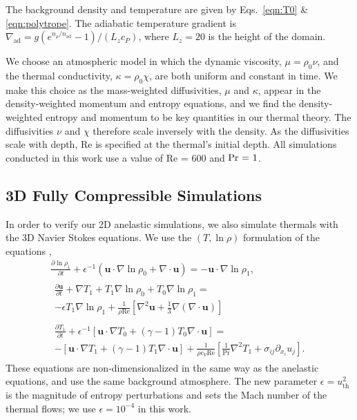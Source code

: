 \documentclass[twocolumn, amsmath, amsfonts, amssymb, trackchanges]{aastex62}
\newcommand{\DivU}{\ensuremath{\nabla\cdot\bm{u}}}
\newcommand{\grad}{\ensuremath{\nabla}}
\begin{document}
The background density and temperature are given by Eqs.~\ref{eqn:T0} \& \ref{eqn:polytrope}.
The adiabatic temperature gradient is $\nabla_{\text{ad}}=g(e^{n_\rho/n_{\text{ad}}}-1)/(L_z c_P)$, where $L_z=20$ is the height of the domain.

We choose an atmospheric model in which the dynamic viscosity, $\mu = \rho_0 \nu$, and the thermal conductivity, $\kappa = \rho_0 \chi$, are both uniform and constant in time.
We make this choice as the mass-weighted diffusivities, $\mu$ and $\kappa$, appear in the density-weighted momentum and entropy equations, and we find the density-weighted entropy and momentum to be key quantities in our thermal theory.
The diffusivities $\nu$ and $\chi$ therefore scale inversely with the density.
As the diffusivities scale with depth, Re is specified at the thermal's initial depth.
All simulations conducted in this work use a value of Re = 600 and $\mbox{\text{Pr} = 1}$.

\subsection{3D Fully Compressible Simulations}
In order to verify our 2D anelastic simulations, we also simulate thermals with the 3D Navier Stokes equations. 
We use the $(T, \ln\rho)$ formulation of the equations \citep{lecoanet&all2014, anders&brown2017},
\begin{gather}
\frac{\partial \ln\rho_1}{\partial t} + \epsilon^{-1}\left(\bm{u}\cdot\grad\ln\rho_0 + \DivU\right) = -\bm{u}\cdot\grad\ln\rho_1, \\
\begin{split}
\frac{\partial \bm{u}}{\partial t}  +\grad T_1 + T_1\grad\ln\rho_0 + T_0\grad\ln\rho_1  =\\
- \epsilon T_1\grad\ln\rho_1 + \frac{1}{\rho\text{Re}}\left[\grad^2\bm{u} + \frac{1}{3}\grad(\DivU)\right]
\end{split} \\
\begin{split}
\frac{\partial T_1}{\partial t} + \epsilon^{-1}\left[\bm{u}\cdot\grad T_0 + (\gamma-1)T_0\DivU\right] = \\
-\left[\bm{u}\cdot\grad T_1 + (\gamma-1)T_1\DivU\right] + \frac{1}{\rho c_V\text{Re}}\left[\frac{1}{\text{Pr}}\grad^2 T_1 + \sigma_{ij}\partial_{x_i}u_j\right].
\end{split}
\end{gather}
These equations are non-dimensionalized in the same way as the anelastic equations, and use the same background atmosphere.
The new parameter $\epsilon = u_{\text{th}}^2$ is the magnitude of entropy perturbations and sets the Mach number of the thermal flows; we use $\epsilon = 10^{-4}$ in this work. 
\end{document}
